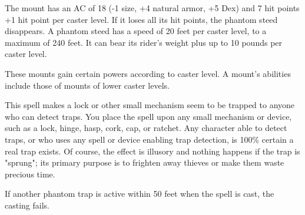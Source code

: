 \begin{multicols}{2}
\begin{small}
\smallskip\noindent The mount has an AC of 18 (-1 size, +4 natural armor, +5 Dex) and 7 hit points +1 hit point per caster level. If it loses all its hit points, the phantom steed disappears. A phantom steed has a speed of 20 feet per caster level, to a maximum of 240 feet. It can bear its rider's weight plus up to 10 pounds per caster level.

\smallskip\noindent These mounts gain certain powers according to caster level. A mount's abilities include those of mounts of lower caster levels. 


\noindent This spell makes a lock or other small mechanism seem to be trapped to anyone who can detect traps. You place the spell upon any small mechanism or device, such as a lock, hinge, hasp, cork, cap, or ratchet. Any character able to detect traps, or who uses any spell or device enabling trap detection, is 100\% certain a real trap exists. Of course, the effect is illusory and nothing happens if the trap is "sprung"; its primary purpose is to frighten away thieves or make them waste precious time.

\smallskip\noindent If another phantom trap is active within 50 feet when the spell is cast, the casting fails.



\end{small}
\end{multicols}
